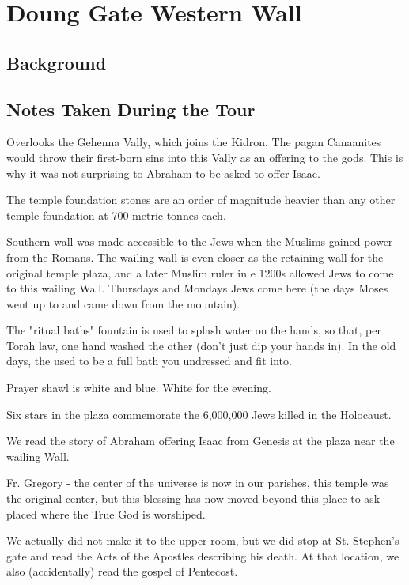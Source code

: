 \documentclass[letterpaper]{report}
\begin{document}
\section{Doung Gate Western Wall}
\begin{multicols}{2}
\subsection{Background}
\subsection{Notes Taken During the Tour}
Overlooks the Gehenna Vally, which joins the Kidron. The pagan Canaanites would throw their first-born sins into this Vally as an offering to the gods. This is why it was not surprising to Abraham to be asked to offer Isaac.

The temple foundation stones are an order of magnitude heavier than any other temple foundation at 700 metric tonnes each.

Southern wall was made accessible to the Jews when the Muslims gained power from the Romans. The wailing wall is even closer as the retaining wall for the original temple plaza, and a later Muslim ruler in e 1200s allowed Jews to come to this wailing Wall.
Thursdays and Mondays Jews come here (the days Moses went up to and came down from the mountain).

The "ritual baths" fountain is used to splash water on the hands, so that, per Torah law, one hand washed the other (don't just dip your hands in). In the old days, the used to be a full bath you undressed and fit into.

Prayer shawl is white and blue. White for the evening.

Six stars in the plaza commemorate the 6,000,000 Jews killed in the Holocaust.

We read the story of Abraham offering Isaac from Genesis at the plaza near the wailing Wall.

Fr. Gregory - the center of the universe is now in our parishes, this temple was the original center, but this blessing has now moved beyond this place to ask placed where the True God is worshiped.

We actually did not make it to the upper-room,
but we did stop at St. Stephen's gate and read the Acts of the Apostles describing his death.
At that location, we also (accidentally) read the gospel of Pentecost.

\end{multicols}
\end{document}
